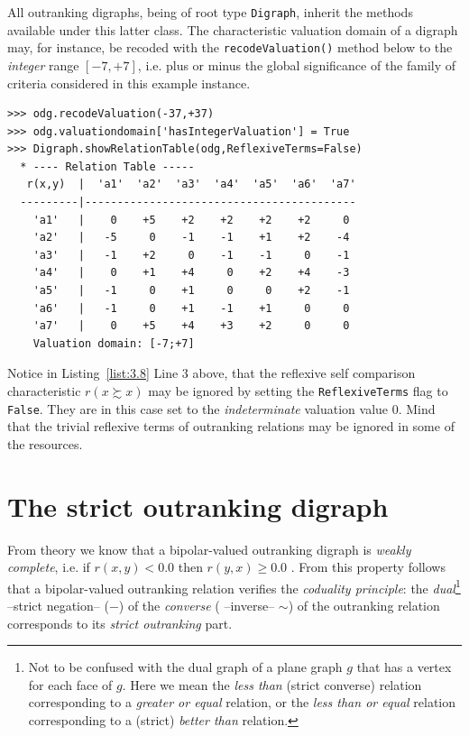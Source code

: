 All outranking digraphs, being of root type {\tt Digraph}, inherit the methods available under this latter class. The characteristic valuation domain of a digraph may, for instance,  be recoded with the {\tt recodeValuation()} method below to the {\em integer\/} range $[-7,+7]$, i.e. plus or minus the global significance of the family of criteria considered in this example instance.
\begin{lstlisting}[caption={Recoding the digraph valuation},label=list:3.8]
>>> odg.recodeValuation(-37,+37)
>>> odg.valuationdomain['hasIntegerValuation'] = True
>>> Digraph.showRelationTable(odg,ReflexiveTerms=False)
  * ---- Relation Table -----
   r(x,y)  |  'a1'  'a2'  'a3'  'a4'  'a5'  'a6'  'a7'	  
  ---------|------------------------------------------
    'a1'   |    0    +5    +2    +2    +2    +2     0	 
    'a2'   |   -5     0    -1    -1    +1    +2    -4	 
    'a3'   |   -1    +2     0    -1    -1     0    -1	 
    'a4'   |    0    +1    +4     0    +2    +4    -3	 
    'a5'   |   -1     0    +1     0     0    +2    -1	 
    'a6'   |   -1     0    +1    -1    +1     0     0	 
    'a7'   |    0    +5    +4    +3    +2     0     0	 
    Valuation domain: [-7;+7]
\end{lstlisting}
Notice in Listing~\ref{list:3.8} Line 3 above, that the reflexive self comparison characteristic $r(x \succsim x)$ may be ignored by setting the \texttt{ReflexiveTerms} flag to \texttt{False}. They are in this case set to the \emph{indeterminate} valuation value $0$. Mind that the trivial reflexive terms of outranking relations may be ignored in some of the \Digraph resources. 

\section{The strict outranking digraph}
\label{sec:3.5}

From theory we know that a bipolar-valued outranking digraph is \emph{weakly complete}, i.e. if $r(x,y) < 0.0$ then $r(y,x) \geq 0.0$ \citep{BIS-2013, ADT-L7}. From this property follows that a bipolar-valued outranking relation verifies the \emph{coduality principle}: the \emph{dual}\footnote{Not to be confused with the dual graph of a plane graph $g$ that has a vertex for each face of $g$. Here we mean the \emph{less than} (strict converse) relation corresponding to a \emph{greater or equal} relation, or the \emph{less than or equal} relation corresponding to a (strict) \emph{better than} relation.} --strict negation-- ($-$) of the \emph{converse} ( --inverse-- $\sim$) of the outranking relation corresponds to its {\em strict outranking\/} part.

